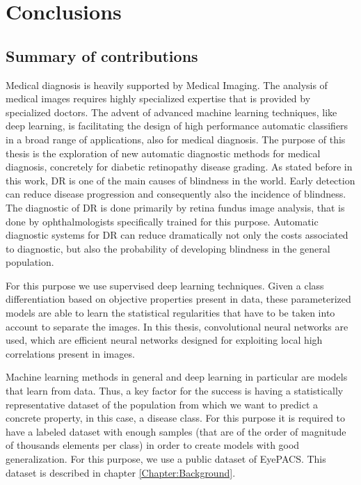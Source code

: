 
\chapter{Conclusions} %

\label{Chapter:Conclusions} %


\section{Summary of contributions}

Medical diagnosis is heavily supported by Medical Imaging. The analysis of medical images requires highly specialized expertise that is provided by specialized doctors. The advent of advanced machine learning techniques, like deep learning, is facilitating the design of high performance automatic classifiers in a broad range of applications, also for medical diagnosis. The purpose of this thesis is the exploration of new automatic diagnostic methods for medical diagnosis, concretely for diabetic retinopathy disease grading. As stated before in this work, DR is one of the main causes of blindness in the world. Early detection can reduce disease progression and consequently also the incidence of blindness. The diagnostic of DR is done primarily by retina fundus image analysis, that is done by ophthalmologists specifically trained for this purpose. Automatic diagnostic systems for DR can reduce dramatically not only the costs associated to diagnostic, but also the probability of developing blindness in the general population.

For this purpose we use supervised deep learning techniques. Given a class differentiation based on objective properties present in data, these parameterized models are able to learn the statistical regularities that have to be taken into account to separate the images. In this thesis, convolutional neural networks are used, which are efficient neural networks designed for exploiting local high correlations present in images. 

Machine learning methods in general and deep learning in particular are models that learn from data. Thus, a key factor for the success is having a statistically representative dataset of the population from which we want to predict a concrete property, in this case, a disease class. For this purpose it is required to have a labeled dataset with enough samples (that are of the order of magnitude of thousands elements per class) in order to create models with good generalization. For this purpose, we use a public dataset of EyePACS. This dataset is described in chapter \ref{Chapter:Background}.

